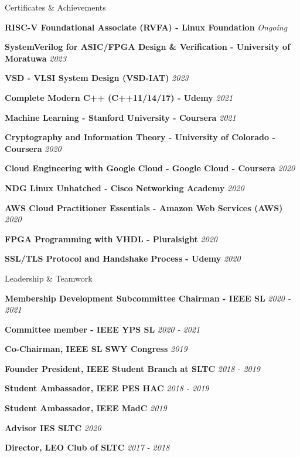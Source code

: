 \documentclass[
	11pt, %
]{./assets/resume} %
\begin{document}
\begin{rSection}{Certificates \& Achievements}


	\textbf{RISC-V Foundational Associate (RVFA) - Linux Foundation} \hfill \textit{Ongoing}

	\textbf{SystemVerilog for ASIC/FPGA Design \& Verification - University of Moratuwa} \hfill \textit{2023}

	\textbf{VSD - VLSI System Design (VSD-IAT)} \hfill \textit{2023}
	
	\textbf{Complete Modern C++ (C++11/14/17) - Udemy} \hfill \textit{2021}

	\textbf{Machine Learning - Stanford University - Coursera} \hfill \textit{2021}

	\textbf{Cryptography and Information Theory - University of Colorado - Coursera} \hfill \textit{2020}

	\textbf{Cloud Engineering with Google Cloud - Google Cloud - Coursera} \hfill \textit{2020}

	\textbf{NDG Linux Unhatched - Cisco Networking Academy} \hfill \textit{2020}

	\textbf{AWS Cloud Practitioner Essentials - Amazon Web Services (AWS)} \hfill \textit{2020}

	\textbf{FPGA Programming with VHDL - Pluralsight} \hfill \textit{2020}
	
	\textbf{SSL/TLS Protocol and Handshake Process - Udemy} \hfill \textit{2020}

\end{rSection}


\begin{rSection}{Leadership \& Teamwork}

	\textbf{Membership Development Subcommittee Chairman - IEEE SL} \hfill \textit{2020 - 2021}

	\textbf{Committee member - IEEE YPS SL} \hfill \textit{2020 - 2021}
	
	\textbf{Co-Chairman, IEEE SL SWY Congress} \hfill \textit{2019}

	\textbf{Founder President, IEEE Student Branch at SLTC} \hfill \textit{2018 - 2019}

	\textbf{Student Ambassador, IEEE PES HAC} \hfill \textit{2018 - 2019}

	\textbf{Student Ambassador, IEEE MadC} \hfill \textit{2019}

	\textbf{Advisor IES SLTC} \hfill \textit{2020}

	\textbf{Director, LEO Club of SLTC} \hfill \textit{2017 - 2018}

\end{rSection}
\end{document}
